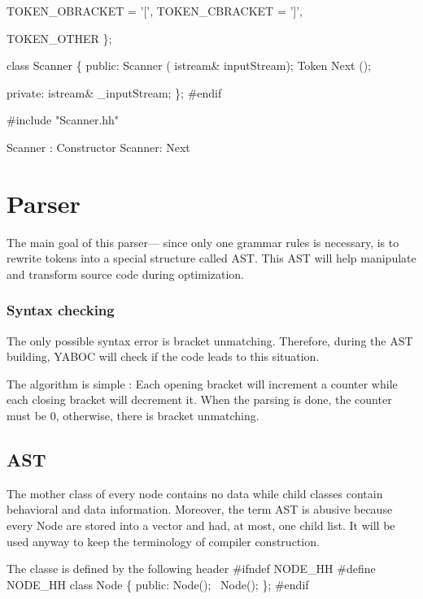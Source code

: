         TOKEN_OBRACKET  = '[',
        TOKEN_CBRACKET  = ']',

        TOKEN_OTHER
\};

class Scanner \{
        public:
                Scanner ( istream& inputStream);
                Token Next ();

        private:
                istream& _inputStream;
\};
#endif
\nwendcode{}\nwdocspar

\nwenddocs{}\endmoddef\nwstartdeflinemarkup\nwenddeflinemarkup
#include "Scanner.hh"

\LA{}Scanner : Constructor\RA{}
\LA{}Scanner: Next\RA{}
\nwendcode{}\nwdocspar
\nwenddocs{}\section{Parser}
The main goal of this parser--- since only one grammar rules is necessary, is to rewrite tokens into a special structure called \gls{AST}. This \gls{AST} will help manipulate and transform source code during optimization. 

\subsubsection{Syntax checking}
The only possible syntax error is bracket unmatching. Therefore, during the \gls{AST} building, YABOC will check if the code leads to this situation.

The algorithm is simple : Each opening bracket will increment a counter while each closing bracket will decrement it. When the parsing is done, the counter must be $0$, otherwise, there is bracket unmatching. 


\subsection{AST}
The mother class of every node contains no data while child classes contain behavioral and data information. Moreover, the term \gls{AST} is abusive because every Node are stored into a vector and had, at most, one child list. It will be used anyway to keep the terminology of compiler construction.

\newpar The classe is defined by the following header 
\nwenddocs{}\endmoddef\nwstartdeflinemarkup\nwenddeflinemarkup
#ifndef NODE_HH
#define NODE_HH
class Node \{
        public:
                Node();
                ~Node();
\};
#endif
\nwendcode{}\nwdocspar

